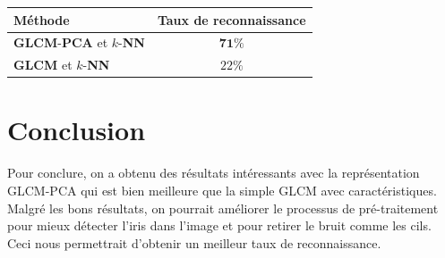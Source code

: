 \documentclass[12pt,twoside,letterpaper]{article}
\begin{document}
	 \begin{center}
		\vspace{0.3em}
		{ \fontsize{12}{12}\selectfont 
    	\begin{tabular}{l|c}
        	Méthode 	& Taux de reconnaissance \\ \hline
            \textbf{GLCM}-\textbf{PCA} et $k$-\textbf{NN}   & $\mathbf{71\%}$ \\ \hline
            \textbf{GLCM} et $k$-\textbf{NN}     			& $22\%$ \\ \hline
    	\end{tabular}     		
    	}
    \end{center}


\section{Conclusion}
Pour conclure, on a obtenu des résultats intéressants avec la représentation GLCM-PCA qui est bien meilleure que la simple GLCM avec caractéristiques. Malgré les bons résultats, on pourrait améliorer le processus de pré-traitement pour mieux détecter l’iris dans l’image et pour retirer le bruit comme les cils. Ceci nous permettrait d'obtenir un meilleur taux de reconnaissance.

\newpage

\end{document}
